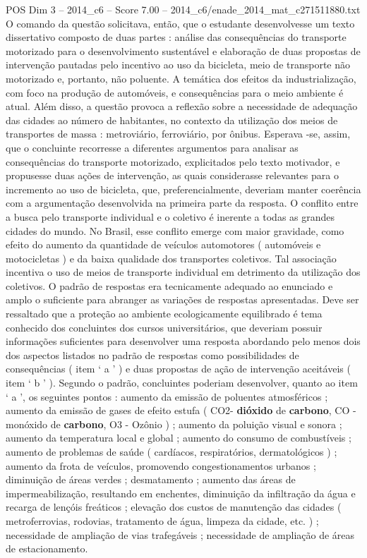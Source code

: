 \begin{textsample}{POS Dim 3 – 2014\_c6 – Score 7.00 – 2014\_c6/enade\_2014\_mat\_c271511880.txt}
O comando da questão solicitava, então, que o estudante desenvolvesse um texto dissertativo composto de duas partes : análise das consequências do transporte motorizado para o desenvolvimento sustentável e elaboração de duas propostas de intervenção pautadas pelo incentivo ao uso da bicicleta, meio de transporte não motorizado e, portanto, não poluente.
A temática dos efeitos da industrialização, com foco na produção de automóveis, e consequências para o meio ambiente é atual.
Além disso, a questão provoca a reflexão sobre a necessidade de adequação das cidades ao número de habitantes, no contexto da utilização dos meios de transportes de massa : metroviário, ferroviário, por ônibus.
Esperava -se, assim, que o concluinte recorresse a diferentes argumentos para analisar as consequências do transporte motorizado, explicitados pelo texto motivador, e propusesse duas ações de intervenção, as quais considerasse relevantes para o incremento ao uso de bicicleta, que, preferencialmente, deveriam manter coerência com a argumentação desenvolvida na primeira parte da resposta.
O conflito entre a busca pelo transporte individual e o coletivo é inerente a todas as grandes cidades do mundo.
No Brasil, esse conflito emerge com maior gravidade, como efeito do aumento da quantidade de veículos automotores ( automóveis e motocicletas ) e da baixa qualidade dos transportes coletivos.
Tal associação incentiva o uso de meios de transporte individual em detrimento da utilização dos coletivos.
O padrão de respostas era tecnicamente adequado ao enunciado e amplo o suficiente para abranger as variações de respostas apresentadas.
Deve ser ressaltado que a proteção ao ambiente ecologicamente equilibrado é tema conhecido dos concluintes dos cursos universitários, que deveriam possuir informações suficientes para desenvolver uma resposta abordando pelo menos dois dos aspectos listados no padrão de respostas como possibilidades de consequências ( item ‘ a ’ ) e duas propostas de ação de intervenção aceitáveis ( item ‘ b ’ ).
Segundo o padrão, concluintes poderiam desenvolver, quanto ao item ‘ a ’, os seguintes pontos : aumento da emissão de poluentes atmosféricos ; aumento da emissão de gases de efeito estufa ( CO2- \textbf{dióxido} de \textbf{carbono}, CO - monóxido de \textbf{carbono}, O3 - Ozônio ) ; aumento da poluição visual e sonora ; aumento da temperatura local e global ; aumento do consumo de combustíveis ; aumento de problemas de saúde ( cardíacos, respiratórios, dermatológicos ) ; aumento da frota de veículos, promovendo congestionamentos urbanos ; diminuição de áreas verdes ; desmatamento ; aumento das áreas de impermeabilização, resultando em enchentes, diminuição da infiltração da água e recarga de lençóis freáticos ; elevação dos custos de manutenção das cidades ( metroferrovias, rodovias, tratamento de água, limpeza da cidade, etc. ) ; necessidade de ampliação de vias trafegáveis ; necessidade de ampliação de áreas de estacionamento.

\end{textsample}
